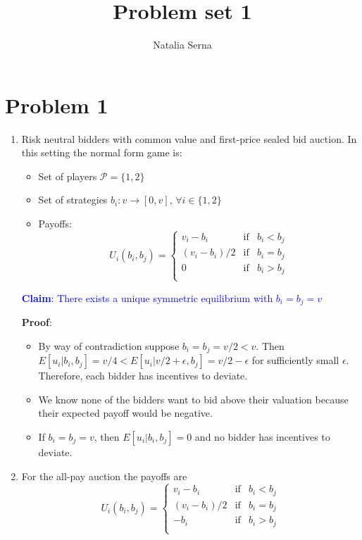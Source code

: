 \documentclass[11pt,english]{article}
\author{
Natalia Serna
   }
\title{Problem set 1}
\date{}
\begin{document}
\maketitle

\section{Problem 1}

\begin{enumerate}
\item Risk neutral bidders with common value and first-price sealed bid auction. In this setting the normal form game is:

\begin{itemize}
\item Set of players $\mathcal{P}=\{1,2\}$
\item Set of strategies $b_{i}:v\to [0,v]$, $\forall i\in\{1,2\}$ 
\item Payoffs:
\begin{equation}
\nonumber
U_{i}(b_{i}, b_{j})=\left\{
\begin{array}{ccc}
v_{i}-b_{i}& \mbox{if}& b_{i}<b_{j}\\
(v_{i}-b_{i})/2& \mbox{if}& b_{i}=b_{j}\\
0 & \mbox{if}& b_{i}>b_{j}\\
\end{array}\right.
\end{equation}
\end{itemize}


\textcolor{blue}{\textbf{Claim}: There exists a unique symmetric equilibrium with $b_{i}=b_{j}=v$}

\textbf{Proof}:
\begin{itemize}
\item By way of contradiction suppose $b_{i}=b_{j}=v/2<v$. Then $E[u_{i}|b_{i}, b_{j}]=v/4<E[u_{i}|v/2+\epsilon, b_{j}]=v/2-\epsilon$ for sufficiently small $\epsilon$. Therefore, each bidder has incentives to deviate.
\item We know none of the bidders want to bid above their valuation because their expected payoff would be negative.
\item If $b_{i}=b_{j}=v$, then $E[u_{i}|b_{i}, b_{j}]=0$ and no bidder has incentives to deviate.
\end{itemize}

\item For the all-pay auction the payoffs are
\begin{equation}
\nonumber
U_{i}(b_{i}, b_{j})=\left\{
\begin{array}{ccc}
v_{i}-b_{i}& \mbox{if}& b_{i}<b_{j}\\
(v_{i}-b_{i})/2& \mbox{if}& b_{i}=b_{j}\\
-b_{i} & \mbox{if}& b_{i}>b_{j}\\
\end{array}\right.
\end{equation}


\end{enumerate}
\end{document}

